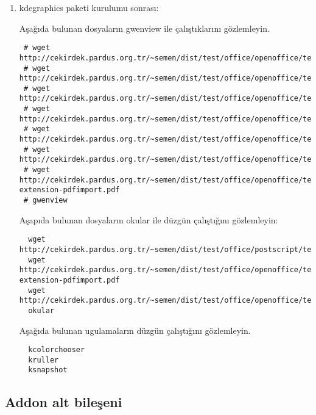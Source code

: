 \documentclass[a4paper,10pt]{article}
\begin{document}
\begin{enumerate}
\item kdegraphics paketi kurulumu sonrası:

Aşağıda bulunan dosyaların gwenview  ile çalıştıklarını gözlemleyin.  
\begin{verbatim} 
 # wget http://cekirdek.pardus.org.tr/~semen/dist/test/office/openoffice/test_oodraw.jpg
 # wget http://cekirdek.pardus.org.tr/~semen/dist/test/office/openoffice/test_oodraw.mng
 # wget http://cekirdek.pardus.org.tr/~semen/dist/test/office/openoffice/test_oodraw.png
 # wget http://cekirdek.pardus.org.tr/~semen/dist/test/office/openoffice/test_oodraw.ps
 # wget http://cekirdek.pardus.org.tr/~semen/dist/test/office/openoffice/test_oodraw.tif
 # wget http://cekirdek.pardus.org.tr/~semen/dist/test/office/openoffice/test_oodraw.xcf
 # wget http://cekirdek.pardus.org.tr/~semen/dist/test/office/openoffice/test_openoffice-extension-pdfimport.pdf
 # gwenview
\end{verbatim}
Aşapıda bulunan dosyaların okular ile düzgün çalıştığını gözlemleyin:
\begin{verbatim} 
  wget http://cekirdek.pardus.org.tr/~semen/dist/test/office/postscript/test_ghostscript.dvi
  wget http://cekirdek.pardus.org.tr/~semen/dist/test/office/openoffice/test_openoffice-extension-pdfimport.pdf
  wget http://cekirdek.pardus.org.tr/~semen/dist/test/office/openoffice/test_oodraw.ps
  okular
 \end{verbatim}

Aşağıda bulunan ugulamaların düzgün çalıştığını gözlemleyin.
\begin{verbatim}
  kcolorchooser
  kruller
  ksnapshot
\end{verbatim}


\end{enumerate}

\subsection*{Addon alt bileşeni}
\end{document}
